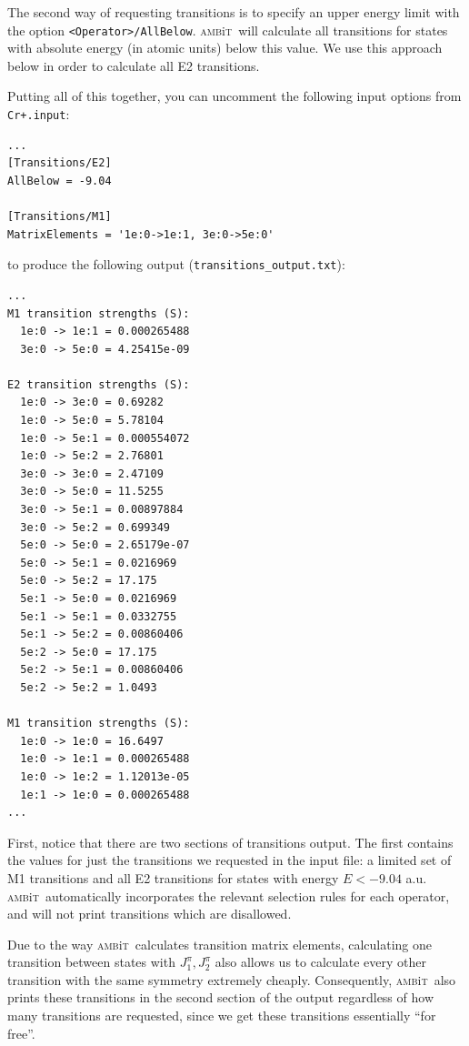 \documentclass{report}
\newcommand{\ambit}{\textsc{amb}{\footnotesize i}\textsc{t}}
\begin{document}
The second way of requesting transitions is to specify an upper energy limit with the option
\texttt{<Operator>/AllBelow}. \ambit\  will calculate all transitions for states with absolute energy (in
atomic units) below this value. We use this approach below in order to calculate all E2 
transitions.

Putting all of this together, you can uncomment the following input options from \texttt{Cr+.input}:

\begin{verbatim}
...
[Transitions/E2]
AllBelow = -9.04

[Transitions/M1]
MatrixElements = '1e:0->1e:1, 3e:0->5e:0'
\end{verbatim}

to produce the following output (\texttt{transitions\_output.txt}):

\begin{verbatim}
...
M1 transition strengths (S):
  1e:0 -> 1e:1 = 0.000265488
  3e:0 -> 5e:0 = 4.25415e-09

E2 transition strengths (S):
  1e:0 -> 3e:0 = 0.69282
  1e:0 -> 5e:0 = 5.78104
  1e:0 -> 5e:1 = 0.000554072
  1e:0 -> 5e:2 = 2.76801
  3e:0 -> 3e:0 = 2.47109
  3e:0 -> 5e:0 = 11.5255
  3e:0 -> 5e:1 = 0.00897884
  3e:0 -> 5e:2 = 0.699349
  5e:0 -> 5e:0 = 2.65179e-07
  5e:0 -> 5e:1 = 0.0216969
  5e:0 -> 5e:2 = 17.175
  5e:1 -> 5e:0 = 0.0216969
  5e:1 -> 5e:1 = 0.0332755
  5e:1 -> 5e:2 = 0.00860406
  5e:2 -> 5e:0 = 17.175
  5e:2 -> 5e:1 = 0.00860406
  5e:2 -> 5e:2 = 1.0493

M1 transition strengths (S):
  1e:0 -> 1e:0 = 16.6497
  1e:0 -> 1e:1 = 0.000265488
  1e:0 -> 1e:2 = 1.12013e-05
  1e:1 -> 1e:0 = 0.000265488
...
\end{verbatim}

First, notice that there are two sections of transitions output. The first contains the values for just
the transitions we requested in the input file: a limited set of M1 transitions and all E2
transitions for states with energy $E < -9.04$ a.u. \ambit\  automatically incorporates the relevant
selection rules for each operator, and will not print transitions which are disallowed. 

Due to the way \ambit\  calculates transition matrix elements, calculating one transition between states
with $J^{\pi}_1, J^{\pi}_2$ also allows us to calculate every other transition with the same 
symmetry extremely cheaply. Consequently, \ambit\  also prints these transitions in the 
second section of the output regardless of how many transitions are requested, since we get these
transitions essentially ``for free''.
\end{document}
